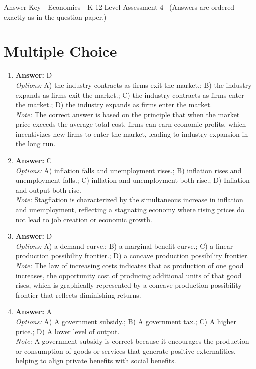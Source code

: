\documentclass[12pt]{article}
\begin{document}
\begin{center}
Answer Key - Economics - K-12 Level Assessment 4 \
\small (Answers are ordered exactly as in the question paper.)
\end{center}

\section*{Multiple Choice}
\begin{enumerate}[label=\arabic*.]
\item \textbf{Answer:} D
\\ \textit{Options:} A) the industry contracts as firms exit the market.; B) the industry expands as firms exit the market.; C) the industry contracts as firms enter the market.; D) the industry expands as firms enter the market.
\\ \textit{Note:} The correct answer is based on the principle that when the market price exceeds the average total cost, firms can earn economic profits, which incentivizes new firms to enter the market, leading to industry expansion in the long run.
\item \textbf{Answer:} C
\\ \textit{Options:} A) inflation falls and unemployment rises.; B) inflation rises and unemployment falls.; C) inflation and unemployment both rise.; D) Inflation and output both rise.
\\ \textit{Note:} Stagflation is characterized by the simultaneous increase in inflation and unemployment, reflecting a stagnating economy where rising prices do not lead to job creation or economic growth.
\item \textbf{Answer:} D
\\ \textit{Options:} A) a demand curve.; B) a marginal benefit curve.; C) a linear production possibility frontier.; D) a concave production possibility frontier.
\\ \textit{Note:} The law of increasing costs indicates that as production of one good increases, the opportunity cost of producing additional units of that good rises, which is graphically represented by a concave production possibility frontier that reflects diminishing returns.
\item \textbf{Answer:} A
\\ \textit{Options:} A) A government subsidy.; B) A government tax.; C) A higher price.; D) A lower level of output.
\\ \textit{Note:} A government subsidy is correct because it encourages the production or consumption of goods or services that generate positive externalities, helping to align private benefits with social benefits.

\end{enumerate}
\end{document}
